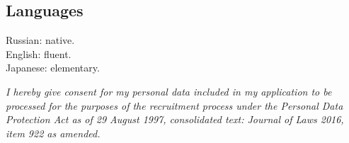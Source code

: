 \documentclass[margin,line]{CV}
\def\consentclause{}
\begin{document}
\begin{resume}


    \section{\mysidestyle Languages}
    Russian: native. \\
    English: fluent. \\
    Japanese: elementary.
  
    \ifdefined\consentclause
    \vspace{5mm}
    {\footnotesize\textit{I hereby give consent for my personal data included in my application to be processed for the purposes of the recruitment process under the Personal Data Protection Act as of 29 August 1997, consolidated text: Journal of Laws 2016, item 922 as amended.}}
    \fi
    
    
\end{resume}
\end{document}
